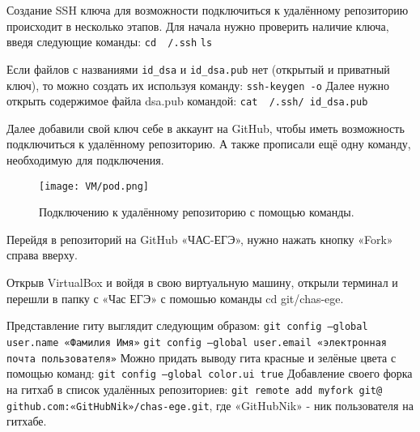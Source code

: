 Создание SSH ключа для возможности подключиться к удалённому репозиторию происходит в несколько этапов.
Для начала нужно проверить наличие ключа, введя следующие команды:
\newline \texttt{cd ~/.ssh}
\newline \texttt{ls}

Если файлов с названиями \texttt{id\_dsa} и \texttt{id\_dsa.pub} нет (открытый и приватный ключ), то можно создать их используя команду:
\newline  \texttt{ssh-keygen -o}
\newline \quad Далее нужно открыть содержимое файла dsa.pub командой:
\newline  \texttt{cat ~/.ssh/ id\_dsa.pub}

Далее добавили свой ключ себе в аккаунт на GitHub, чтобы иметь возможность подключиться к удалённому репозиторию. А также прописали ещё одну команду, необходимую для подключения.

\begin{figure}[h]
		\centering
		\texttt{[image: VM/pod.png]}
\caption{Подключению к удалённому репозиторию с помощью команды.}
\label{ris:image}
\end{figure}

Перейдя в репозиторий на GitHub «ЧАС-ЕГЭ», нужно нажать кнопку «Fork» справа вверху.

Открыв VirtualBox и войдя в свою виртуальную машину, открыли терминал и перешли в папку с «Час ЕГЭ» с помошью команды cd git/chas-ege.

Представление гиту выглядит следующим образом:
\newline \texttt{git config --global user.name «Фамилия Имя»}
\newline \texttt{git config --global user.email «электронная почта пользователя»}
\newline Можно придать выводу гита красные и зелёные цвета с помощью команд:
\texttt{git config --global color.ui true}
\newline Добавление своего форка на гитхаб в список удалённых репозиториев:
\texttt{git remote add myfork git@ github.com:«GitHubNik»/chas-ege.git}, где «GitHubNik» - ник пользователя на гитхабе. 

